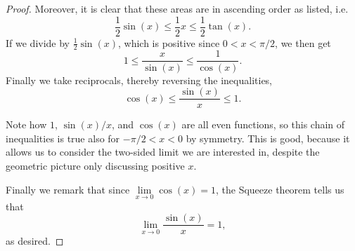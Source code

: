 \begin{proof}
	\noindent
	Moreover, it is clear that these areas are in ascending order as listed, i.e.
	\[
		\frac{1}{2} \sin(x) \leq \frac{1}{2} x \leq \frac{1}{2} \tan(x).
	\]
	If we divide by $\frac{1}{2} \sin(x)$, which is positive since $0 < x < \pi / 2$, we then get
	\[
		1 \leq \frac{x}{\sin(x)} \leq \frac{1}{\cos(x)}.
	\]
	Finally we take reciprocals, thereby reversing the inequalities,
	\[
		\cos(x) \leq \frac{\sin(x)}{x} \leq 1.
	\]

	\noindent
	Note how $1$, $\sin(x) / x$, and $\cos(x)$ are all even functions, so this chain of inequalities is true also for $-\pi / 2 < x < 0$ by symmetry. This is good, because it allows us to consider the two-sided limit we are interested in, despite the geometric picture only discussing positive $x$.

	Finally we remark that since $\lim\limits_{x \to 0} \cos(x) = 1$, the Squeeze theorem tells us that
	\[
		\lim_{x \to 0} \frac{\sin(x)}{x} = 1,
	\]
	as desired.
\end{proof}
